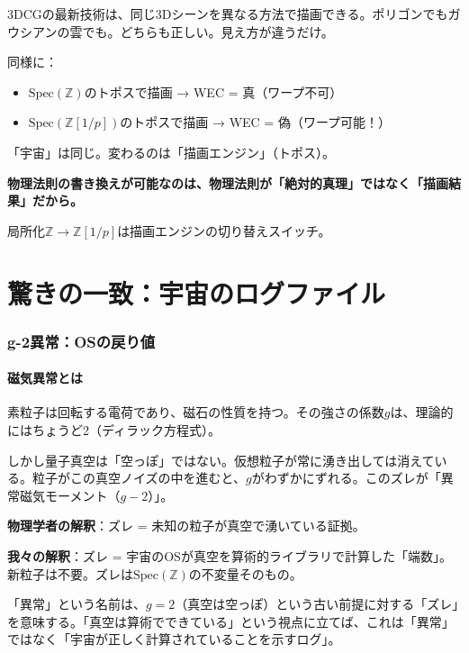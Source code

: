 \documentclass[12pt,a4paper]{article}
\newcommand{\Spec}{\mathrm{Spec}}
\newcommand{\Zp}{\mathbb{Z}[1/p]}
\begin{document}
\begin{storybox}
3DCGの最新技術は、同じ3Dシーンを異なる方法で描画できる。ポリゴンでもガウシアンの雲でも。どちらも正しい。見え方が違うだけ。

同様に：
\begin{itemize}
\item $\Spec(\mathbb{Z})$のトポスで描画 → WEC = 真（ワープ不可）
\item $\Spec(\Zp)$のトポスで描画 → WEC = 偽（ワープ可能！）
\end{itemize}

「宇宙」は同じ。変わるのは「描画エンジン」（トポス）。

\textbf{物理法則の書き換えが可能なのは、物理法則が「絶対的真理」ではなく「描画結果」だから。}

局所化$\mathbb{Z} \to \Zp$は描画エンジンの切り替えスイッチ。
\end{storybox}

\part{驚きの一致：宇宙のログファイル}

\section{g-2異常：OSの戻り値}

\subsection{磁気異常とは}

素粒子は回転する電荷であり、磁石の性質を持つ。その強さの係数$g$は、理論的にはちょうど2（ディラック方程式）。

しかし量子真空は「空っぽ」ではない。仮想粒子が常に湧き出しては消えている。粒子がこの真空ノイズの中を進むと、$g$がわずかにずれる。このズレが「異常磁気モーメント（$g-2$）」。

\begin{deepbox}
\textbf{物理学者の解釈}：ズレ = 未知の粒子が真空で湧いている証拠。

\textbf{我々の解釈}：ズレ = 宇宙のOSが真空を算術的ライブラリで計算した「端数」。新粒子は不要。ズレは$\Spec(\mathbb{Z})$の不変量そのもの。

「異常」という名前は、$g=2$（真空は空っぽ）という古い前提に対する「ズレ」を意味する。「真空は算術でできている」という視点に立てば、これは「異常」ではなく「宇宙が正しく計算されていることを示すログ」。
\end{deepbox}
\end{document}
